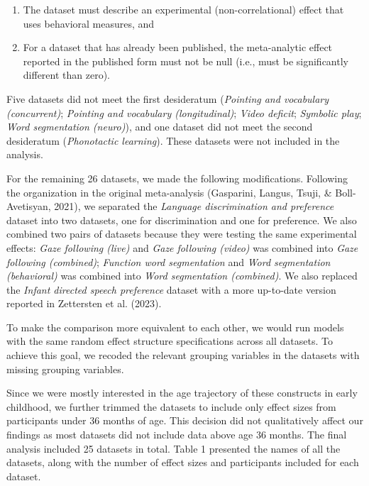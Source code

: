 \documentclass[
  man]{apa6}
\providecommand{\tightlist}{%
  \setlength{\itemsep}{0pt}\setlength{\parskip}{0pt}}
\begin{document}
\begin{enumerate}
\def\labelenumi{\arabic{enumi}.}
\tightlist
\item
  The dataset must describe an experimental (non-correlational) effect that uses behavioral measures, and
\item
  For a dataset that has already been published, the meta-analytic effect reported in the published form must not be null (i.e., must be significantly different than zero).
\end{enumerate}

Five datasets did not meet the first desideratum (\emph{Pointing and vocabulary (concurrent)}; \emph{Pointing and vocabulary (longitudinal)}; \emph{Video deficit}; \emph{Symbolic play}; \emph{Word segmentation (neuro)}), and one dataset did not meet the second desideratum (\emph{Phonotactic learning}). These datasets were not included in the analysis.

For the remaining 26 datasets, we made the following modifications. Following the organization in the original meta-analysis (Gasparini, Langus, Tsuji, \& Boll-Avetisyan, 2021), we separated the \emph{Language discrimination and preference} dataset into two datasets, one for discrimination and one for preference. We also combined two pairs of datasets because they were testing the same experimental effects: \emph{Gaze following (live)} and \emph{Gaze following (video)} was combined into \emph{Gaze following (combined)}; \emph{Function word segmentation} and \emph{Word segmentation (behavioral)} was combined into \emph{Word segmentation (combined)}. We also replaced the \emph{Infant directed speech preference} dataset with a more up-to-date version reported in Zettersten et al. (2023).

To make the comparison more equivalent to each other, we would run models with the same random effect structure specifications across all datasets. To achieve this goal, we recoded the relevant grouping variables in the datasets with missing grouping variables.

Since we were mostly interested in the age trajectory of these constructs in early childhood, we further trimmed the datasets to include only effect sizes from participants under 36 months of age. This decision did not qualitatively affect our findings as most datasets did not include data above age 36 months. The final analysis included 25 datasets in total. Table 1 presented the names of all the datasets, along with the number of effect sizes and participants included for each dataset.
\end{document}

